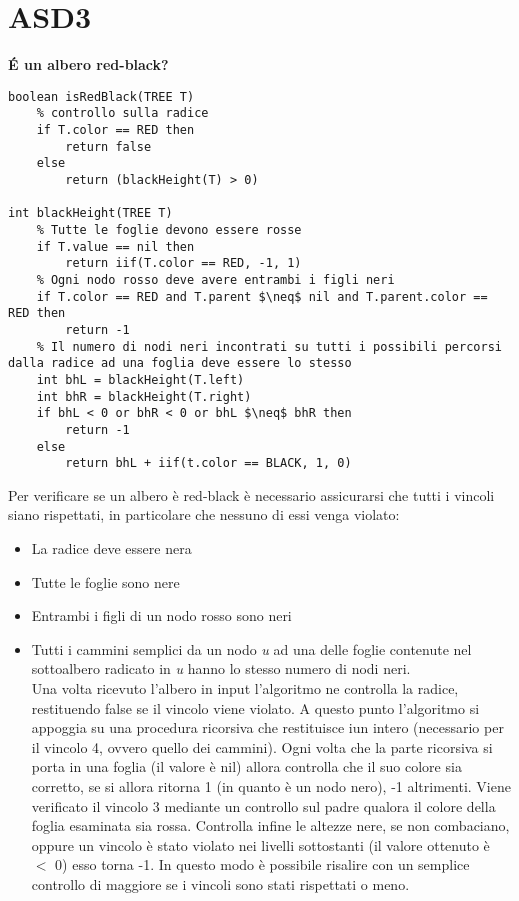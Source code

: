 \documentclass[../cheatSheetAlgoritmi.tex]{subfiles}
\begin{document}
\section{ASD3}
\textbf{É un albero red-black?}

\begin{lstlisting}[caption=É un albero red-black?]
boolean isRedBlack(TREE T)
	% controllo sulla radice
  	if T.color == RED then
    	return false
  	else
    	return (blackHeight(T) > 0)

int blackHeight(TREE T)
  	% Tutte le foglie devono essere rosse
  	if T.value == nil then
    	return iif(T.color == RED, -1, 1)
  	% Ogni nodo rosso deve avere entrambi i figli neri
  	if T.color == RED and T.parent $\neq$ nil and T.parent.color == RED then
    	return -1
  	% Il numero di nodi neri incontrati su tutti i possibili percorsi dalla radice ad una foglia deve essere lo stesso
  	int bhL = blackHeight(T.left)
  	int bhR = blackHeight(T.right)
  	if bhL < 0 or bhR < 0 or bhL $\neq$ bhR then
    	return -1
  	else
    	return bhL + iif(t.color == BLACK, 1, 0)
\end{lstlisting}
Per verificare se un albero è red-black è necessario assicurarsi che tutti i vincoli siano rispettati, in particolare che nessuno di essi venga violato:
\begin{itemize}
 	\item La radice deve essere nera
 	\item Tutte le foglie sono nere
 	\item Entrambi i figli di un nodo rosso sono neri
 	\item Tutti i cammini semplici da un nodo \textit{u} ad una delle foglie contenute nel sottoalbero radicato in \textit{u} hanno lo stesso numero di nodi neri.\\ Una volta ricevuto l'albero in input l'algoritmo ne controlla la radice, restituendo false se il vincolo viene violato. A questo punto l'algoritmo si appoggia su una procedura ricorsiva che restituisce iun intero (necessario per il vincolo 4, ovvero quello dei cammini).
Ogni volta che la parte ricorsiva si porta in una foglia (il valore è nil) allora controlla che il suo colore sia corretto, se si allora ritorna 1 (in quanto è un nodo nero), -1 altrimenti. Viene verificato il vincolo 3 mediante un controllo sul padre qualora il colore della foglia esaminata sia rossa. Controlla infine le altezze nere, se non combaciano, oppure un vincolo è stato violato nei livelli sottostanti (il valore ottenuto è $<$ 0) esso torna -1. In questo modo è possibile risalire con un semplice controllo di maggiore se i vincoli sono stati rispettati o meno.
\end{itemize}\
\end{document}
